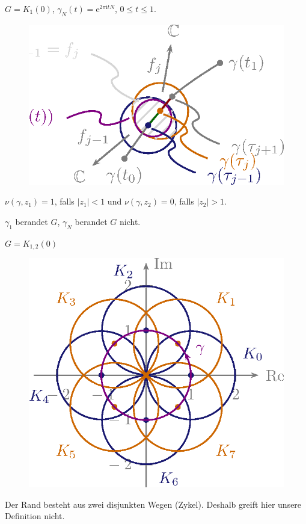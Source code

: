 \documentclass[a4paper,10pt]{scrbook}
\begin{document}
\begin{example*}
  \begin{enum-arab}
    \item $G = K_1(0)$, $\gamma_N(t) = \mathrm{e}^{2 \pi \mathrm{i} t N}$, $0 \leq t \leq 1$.
    \begin{figure}[H]
      \centering
      \includegraphics[scale=0.2]{images/ana3-tmp-38}
      \vspace*{-2em}
    \end{figure}
    $\nu(\gamma,z_1) = 1$, falls $|z_1| < 1$ und $\nu(\gamma,z_2) = 0$, falls $|z_2| > 1$.

    $\gamma_1$ berandet $G$, $\gamma_N$ berandet $G$ nicht.

    \item $G = K_{1,2}(0)$
    \begin{figure}[H]
      \centering
      \includegraphics[scale=0.2]{images/ana3-tmp-39}
      \vspace*{-2em}
    \end{figure}
    Der Rand besteht aus zwei disjunkten Wegen (Zykel). Deshalb greift hier unsere Definition nicht.
  \end{enum-arab}
\end{example*}
\end{document}
